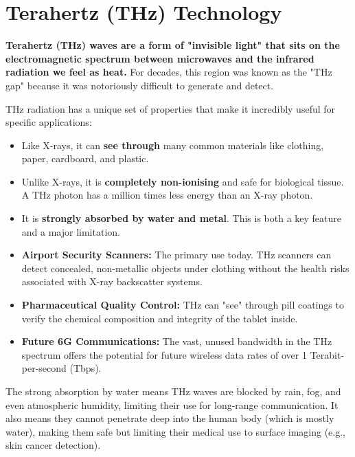 
\chapter{Terahertz (THz) Technology}
\label{ch:thz}

\begin{nontechnical}
    \textbf{Terahertz (THz) waves are a form of "invisible light" that sits on the electromagnetic spectrum between microwaves and the infrared radiation we feel as heat.} For decades, this region was known as the "THz gap" because it was notoriously difficult to generate and detect.

    THz radiation has a unique set of properties that make it incredibly useful for specific applications:
    \begin{itemize}
        \item Like X-rays, it can \textbf{see through} many common materials like clothing, paper, cardboard, and plastic.
        \item Unlike X-rays, it is \textbf{completely non-ionising} and safe for biological tissue. A THz photon has a million times less energy than an X-ray photon.
        \item It is \textbf{strongly absorbed by water and metal}. This is both a key feature and a major limitation.
    \end{itemize}

    \begin{itemize}
        \item \textbf{Airport Security Scanners:} The primary use today. THz scanners can detect concealed, non-metallic objects under clothing without the health risks associated with X-ray backscatter systems.
        \item \textbf{Pharmaceutical Quality Control:} THz can "see" through pill coatings to verify the chemical composition and integrity of the tablet inside.
        \item \textbf{Future 6G Communications:} The vast, unused bandwidth in the THz spectrum offers the potential for future wireless data rates of over 1 Terabit-per-second (Tbps).
    \end{itemize}
    
    The strong absorption by water means THz waves are blocked by rain, fog, and even atmospheric humidity, limiting their use for long-range communication. It also means they cannot penetrate deep into the human body (which is mostly water), making them safe but limiting their medical use to surface imaging (e.g., skin cancer detection).
\end{nontechnical}


